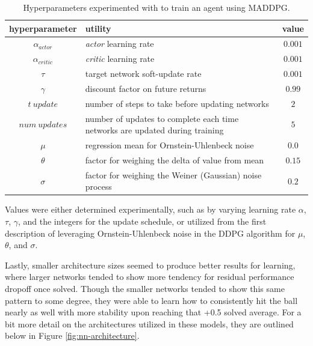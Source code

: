 \documentclass[11pt]{article}
\begin{document}
	\begin{table}[!ht]
		\centering
		\begin{tabular}{ c | p{6cm} | c }
			\textbf{hyperparameter} & \textbf{utility} & \textbf{value} \\
			\hline
			$\alpha_{actor}$ & \textit{actor} learning rate & $0.001$ \\
			$\alpha_{critic}$ & \textit{critic} learning rate & $0.001$ \\
			$\tau$ & target network soft-update rate & $0.001$ \\
			$\gamma$ & discount factor on future returns & $0.99$ \\
			$t\ update$ & number of steps to take before updating networks & $2$ \\
			$num\ updates$ & number of updates to complete each time networks are updated during training & $5$ \\
			$\mu$ & regression mean for Ornstein-Uhlenbeck noise & $0.0$ \\
			$\theta$ & factor for weighing the delta of value from mean & $0.15$ \\
			$\sigma$ & factor for weighing the Weiner (Gaussian) noise process & $0.2$ \\
			\hline
		\end{tabular}
		\caption{Hyperparameters experimented with to train an agent using MADDPG.}
		\label{tbl:parameters}
	\end{table}
	
	Values were either determined experimentally, such as by varying learning rate $\alpha$, $\tau$, $\gamma$, and the integers for the update schedule, or utilized from the first description of leveraging Ornstein-Uhlenbeck noise in the DDPG algorithm \cite{ddpg} for $\mu$, $\theta$, and $\sigma$.
	
	Lastly, smaller architecture sizes seemed to produce better results for learning, where larger networks tended to show more tendency for residual performance dropoff once solved. Though the smaller networks tended to show this same pattern to some degree, they were able to learn how to consistently hit the ball nearly as well with more stability upon reaching that +0.5 solved average. For a bit more detail on the architectures utilized in these models, they are outlined below in Figure \ref{fig:nn-architecture}.
	
	\FloatBarrier
	
\end{document}
